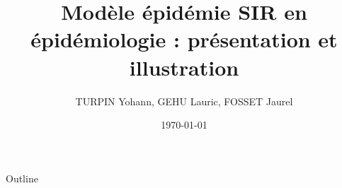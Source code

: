 \documentclass{beamer}
\title{Modèle épidémie SIR en épidémiologie : présentation et illustration}
\author{TURPIN Yohann, GEHU Lauric, FOSSET Jaurel}
\date{\today}
\begin{document}
    
    \begin{frame}
        \titlepage
    \end{frame}

    \begin{frame}
        
    \end{frame}

    \begin{frame}{Outline}
        \tableofcontents
    \end{frame}


    


    
    
    
    
    
\end{document}
